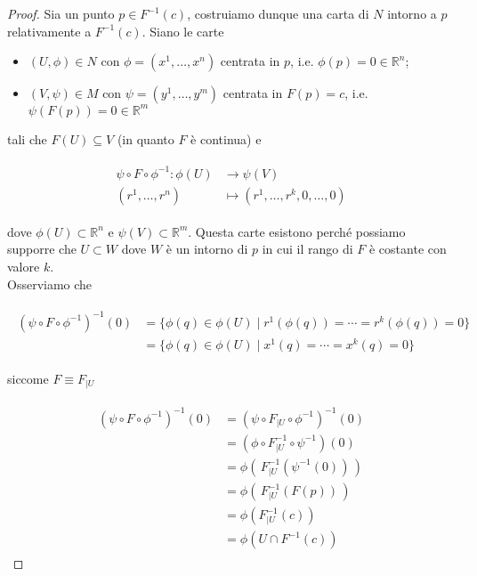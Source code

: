 \begin{proof}
	Sia un punto $ p \in F^{-1}(c) $, costruiamo dunque una carta di $ N $ intorno a $ p $ relativamente a $ F^{-1}(c) $. Siano le carte
	
	\begin{itemize}
		\item $ (U,\phi) \in N $ con $ \phi = (x^{1},\dots,x^{n}) $ centrata in $ p $, i.e. $ \phi(p) = 0 \in \mathbb{R}^{n} $;
		
		\item $ (V,\psi) \in M $ con $ \psi = (y^{1},\dots,y^{m}) $ centrata in $ F(p) = c $, i.e. $ \psi(F(p)) = 0 \in \mathbb{R}^{m} $
	\end{itemize}

	tali che $ F(U) \subseteq V $ (in quanto $ F $ è continua) e
	
	\begin{align}
		\begin{split}
			\psi \circ F \circ \phi^{-1} : \phi(U) &\to \psi(V)\\
			(r^{1},\dots,r^{n}) &\mapsto (r^{1},\dots,r^{k},0,\dots,0)
		\end{split}
	\end{align}

	dove $ \phi(U) \subset \mathbb{R}^{n} $ e $ \psi(V) \subset \mathbb{R}^{m} $. Questa carte esistono perché possiamo supporre che $ U \subset W $ dove $ W $ è un intorno di $ p $ in cui il rango di $ F $ è costante con valore $ k $.\\
	Osserviamo che
	
	\begin{align}
		\begin{split}
			(\psi \circ F \circ \phi^{-1})^{-1}(0) &= \{ \phi(q) \in \phi(U) \mid r^{1}(\phi(q)) = \cdots = r^{k}(\phi(q)) = 0 \}\\
			&= \{ \phi(q) \in \phi(U) \mid x^{1}(q) = \cdots = x^{k}(q) = 0 \}
		\end{split}
	\end{align}

	siccome $ F \equiv F_{|U} $
	
	\begin{align}
		\begin{split}
			(\psi \circ F \circ \phi^{-1})^{-1}(0) &= (\psi \circ F_{|U} \circ \phi^{-1})^{-1}(0) \\
			&= (\phi \circ F_{|U}^{-1} \circ \psi^{-1})(0)\\
			&= \phi( \, F_{|U}^{-1}(\psi^{-1}(0)) \, )\\
			&= \phi( \, F_{|U}^{-1}(F(p)) \, )\\
			&= \phi( F_{|U}^{-1}(c) )\\
			&= \phi( U \cap F^{-1}(c) )
		\end{split}
	\end{align}


\end{proof}
